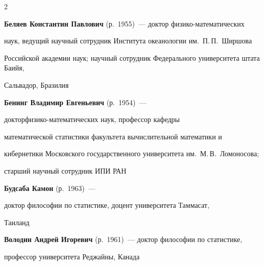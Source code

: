 \begin{multicols}{2}










\noindent

\textbf{Беляев Константин Павлович} (р.\ 1955)~--- доктор фи\-зи\-ко-ма\-те\-ма\-ти\-че\-ских 

наук, ведущий научный сотрудник Института океанологии им.\ П.\,П.~Ширшова 

Российской академии наук; научный сотрудник Федерального университета штата Баийя, 

Сальвадор, Бразилия



\vspace*{4pt}



\noindent

\textbf{Бенинг Владимир Евгеньевич} (р.\ 1954)~--- 

доктор\linebreak фи\-зи\-ко-ма\-те\-ма\-ти\-че\-ских наук, профессор кафедры 

математической статистики факультета вычислительной математики и 

кибернетики Московского государственного университета им.\ М.\,В.~Ломоносова; 

старший научный сотрудник ИПИ РАН



\vspace*{4pt}



\noindent

\textbf{Будсаба Камон} (р.\ 1963)~--- 

доктор философии по статистике, доцент университета Таммасат,

Таиланд



\vspace*{4pt}



\noindent

\textbf{Володин Андрей Игоревич} (р.\ 1961)~--- доктор философии  по статистике,

профессор университета Реджайны, Канада



\vspace*{4pt}




\end{multicols}
